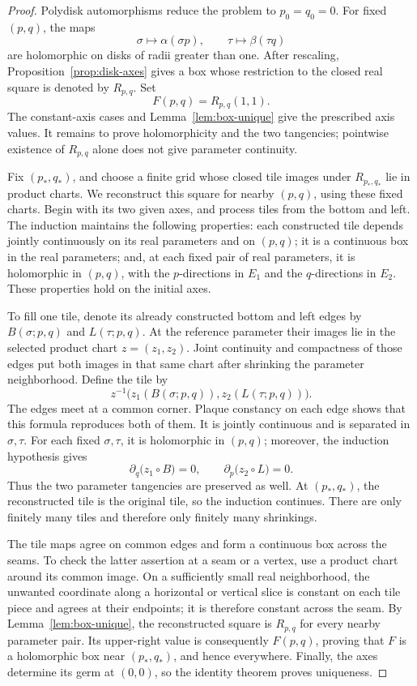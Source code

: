\begin{proof}
Polydisk automorphisms reduce the problem to \(p_0=q_0=0\).
For fixed \((p,q)\), the maps
\[
 \sigma\longmapsto\alpha(\sigma p),\qquad
 \tau\longmapsto\beta(\tau q)
\]
are holomorphic on disks of radii greater than one. After rescaling,
Proposition~\ref{prop:disk-axes} gives a box whose restriction to the
closed real square is denoted by \(R_{p,q}\). Set
\[
 F(p,q)=R_{p,q}(1,1).
\]
The constant-axis cases and Lemma~\ref{lem:box-unique} give the prescribed
axis values. It remains to prove holomorphicity and the two tangencies;
pointwise existence of \(R_{p,q}\) alone does not give parameter
continuity.

Fix \((p_*,q_*)\), and choose a finite grid whose closed tile images
under \(R_{p_*,q_*}\) lie in product charts. We reconstruct this square
for nearby \((p,q)\), using these fixed charts. Begin with its two
given axes, and process tiles from the bottom and left. The induction
maintains the following properties: each constructed tile depends
jointly continuously on its real parameters and on \((p,q)\); it is a
continuous box in the real parameters; and, at each fixed pair of real
parameters, it is holomorphic in \((p,q)\), with the \(p\)-directions
in \(E_1\) and the \(q\)-directions in \(E_2\). These properties hold
on the initial axes.

To fill one tile, denote its already constructed bottom and left edges
by \(B(\sigma;p,q)\) and \(L(\tau;p,q)\). At the reference parameter
their images lie in the selected product chart \(z=(z_1,z_2)\).
Joint continuity and compactness of those edges put both images in that
same chart after shrinking the parameter neighborhood. Define the tile
by
\begin{equation}\label{eq:parameter-tile}
 z^{-1}\bigl(z_1(B(\sigma;p,q)),z_2(L(\tau;p,q))\bigr).
\end{equation}
The edges meet at a common corner. Plaque constancy on each edge shows
that this formula reproduces both of them. It is jointly continuous and
is separated in \(\sigma,\tau\). For each fixed \(\sigma,\tau\), it
is holomorphic in \((p,q)\); moreover, the induction hypothesis gives
\[
 \partial_q\bigl(z_1\circ B\bigr)=0,
 \qquad
 \partial_p\bigl(z_2\circ L\bigr)=0.
\]
Thus the two parameter tangencies are preserved as well. At
\((p_*,q_*)\), the reconstructed tile is the original tile, so the
induction continues. There are only finitely many tiles and therefore
only finitely many shrinkings.

The tile maps agree on common edges and form a continuous box across
the seams. To check the latter assertion at a seam or a vertex, use a
product chart around its common image. On a sufficiently small real
neighborhood, the unwanted coordinate along a horizontal or vertical
slice is constant on each tile piece and agrees at their endpoints;
it is therefore constant across the seam. By
Lemma~\ref{lem:box-unique}, the reconstructed square is \(R_{p,q}\)
for every nearby parameter pair. Its upper-right value is consequently
\(F(p,q)\), proving that \(F\) is a holomorphic box near
\((p_*,q_*)\), and hence everywhere. Finally, the axes determine its
germ at \((0,0)\), so the identity theorem proves uniqueness.
\end{proof}

